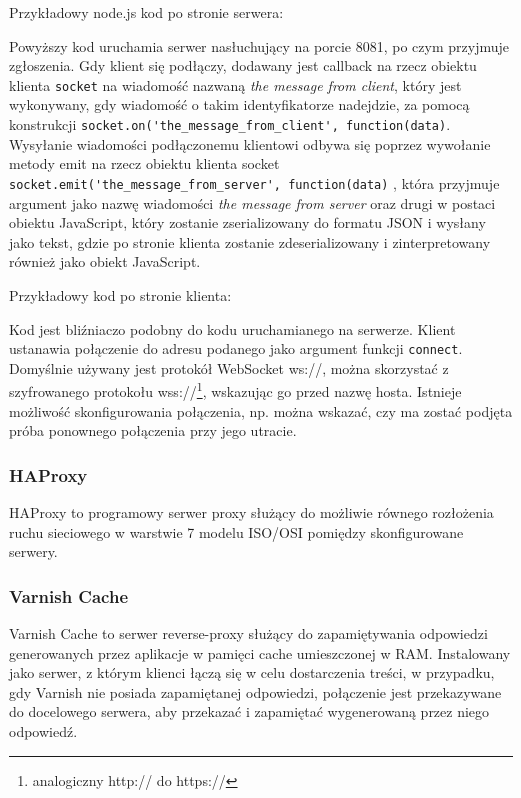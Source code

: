Przykładowy node.js kod po stronie serwera:



Powyższy kod uruchamia serwer nasłuchujący na porcie 8081, po czym przyjmuje zgłoszenia. Gdy klient się podłączy, dodawany jest callback na rzecz obiektu klienta \lstinline{socket} na wiadomość nazwaną \emph{the message from client}, który jest wykonywany, gdy wiadomość o takim identyfikatorze nadejdzie, za pomocą konstrukcji \lstinline{socket.on('the_message_from_client', function(data)}. Wysyłanie wiadomości podłączonemu klientowi odbywa się poprzez wywołanie metody emit na rzecz obiektu klienta socket \lstinline{socket.emit('the_message_from_server', function(data)} , która przyjmuje argument jako nazwę wiadomości \emph{the message from server} oraz drugi w postaci obiektu JavaScript, który zostanie zserializowany do formatu JSON i wysłany jako tekst, gdzie po stronie klienta zostanie zdeserializowany i zinterpretowany również jako obiekt JavaScript.

Przykładowy kod po stronie klienta:



Kod jest bliźniaczo podobny do kodu uruchamianego na serwerze. Klient ustanawia połączenie do adresu podanego jako argument funkcji \lstinline{connect}. Domyślnie używany jest protokół WebSocket ws://, można skorzystać z szyfrowanego protokołu wss://\footnote{analogiczny http:// do https://}, wskazując go przed nazwę hosta. Istnieje możliwość skonfigurowania połączenia, np. można wskazać, czy ma zostać podjęta próba ponownego połączenia przy jego utracie.

\subsubsection{HAProxy}

HAProxy to programowy serwer proxy służący do możliwie równego rozłożenia ruchu sieciowego w warstwie 7 modelu ISO/OSI pomiędzy skonfigurowane serwery.

\subsubsection{Varnish Cache}

Varnish Cache to serwer reverse-proxy służący do zapamiętywania odpowiedzi generowanych przez aplikacje w pamięci cache umieszczonej w RAM. Instalowany jako serwer, z którym klienci łączą się w celu dostarczenia treści, w przypadku, gdy Varnish nie posiada zapamiętanej odpowiedzi, połączenie jest przekazywane do docelowego serwera, aby przekazać i zapamiętać wygenerowaną przez niego odpowiedź.

